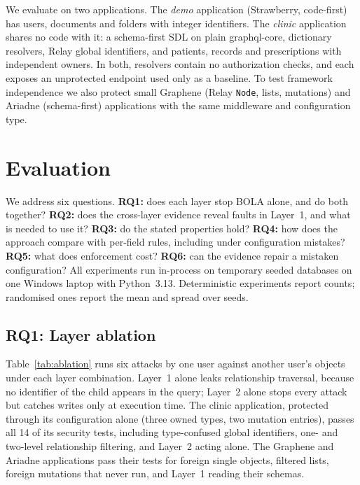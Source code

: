 \documentclass[conference]{IEEEtran}
\newcommand{\code}[1]{\texttt{\small #1}}
\begin{document}
We evaluate on two applications. The \emph{demo} application (Strawberry, code-first) has users, documents and folders with integer identifiers. The \emph{clinic} application shares no code with it: a schema-first SDL on plain graphql-core, dictionary resolvers, Relay global identifiers, and patients, records and prescriptions with independent owners. In both, resolvers contain no authorization checks, and each exposes an unprotected endpoint used only as a baseline. To test framework independence we also protect small Graphene (Relay \code{Node}, lists, mutations) and Ariadne (schema-first) applications with the same middleware and configuration type.

\section{Evaluation}

We address six questions. \textbf{RQ1:} does each layer stop BOLA alone, and do both together? \textbf{RQ2:} does the cross-layer evidence reveal faults in Layer~1, and what is needed to use it? \textbf{RQ3:} do the stated properties hold? \textbf{RQ4:} how does the approach compare with per-field rules, including under configuration mistakes? \textbf{RQ5:} what does enforcement cost? \textbf{RQ6:} can the evidence repair a mistaken configuration? All experiments run in-process on temporary seeded databases on one Windows laptop with Python~3.13. Deterministic experiments report counts; randomised ones report the mean and spread over seeds.

\subsection{RQ1: Layer ablation}\label{sec:ablation}
Table~\ref{tab:ablation} runs six attacks by one user against another user's objects under each layer combination. Layer~1 alone leaks relationship traversal, because no identifier of the child appears in the query; Layer~2 alone stops every attack but catches writes only at execution time. The clinic application, protected through its configuration alone (three owned types, two mutation entries), passes all 14 of its security tests, including type-confused global identifiers, one- and two-level relationship filtering, and Layer~2 acting alone. The Graphene and Ariadne applications pass their tests for foreign single objects, filtered lists, foreign mutations that never run, and Layer~1 reading their schemas.
\end{document}
